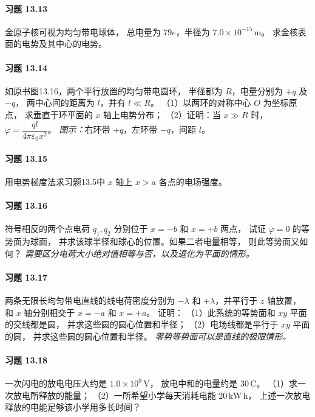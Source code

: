 \paragraph{习题 13.13}
金原子核可视为均匀带电球体，
总电量为 \(79e\)，半径为 \(7.0\times10^{-15}\,\mathrm m\)。
求金核表面的电势及其中心的电势。

\paragraph{习题 13.14}
如原书图13.16，两个平行放置的均匀带电圆环，
半径都为 \(R\)，电量分别为 \(+q\) 及 \(-q\)，
两中心间的距离为 \(l\)，并有 \(l\ll R\)。
（1）以两环的对称中心 \(O\) 为坐标原点，
求垂直于环平面的 \(x\) 轴上电势分布；
（2）证明：当 \(x\gg R\) 时，
\(\varphi=\dfrac{ql}{4\pi\varepsilon_0x^2}\)。
\textit{图示：}右环带 \(+q\)，左环带 \(-q\)，间距 \(l\)。

\paragraph{习题 13.15}
用电势梯度法求习题13.5中 \(x\) 轴上 \(x>a\) 各点的电场强度。

\paragraph{习题 13.16}
符号相反的两个点电荷 \(q_1,q_2\) 分别位于
\(x=-b\) 和 \(x=+b\) 两点，
试证 \(\varphi=0\) 的等势面为球面，
并求该球半径和球心的位置。如果二者电量相等，
则此等势面又如何？
\textit{需要区分电荷大小绝对值相等与否，以及退化为平面的情形。}

\paragraph{习题 13.17}
两条无限长均匀带电直线的线电荷密度分别为
\(-\lambda\) 和 \(+\lambda\)，并平行于 \(z\) 轴放置，
和 \(x\) 轴分别相交于 \(x=-a\) 和 \(x=+a\)。
证明：
（1）此系统的等势面和 \(xy\) 平面的交线都是圆，
并求这些圆的圆心位置和半径；
（2）电场线都是平行于 \(xy\) 平面的圆，
并求这些圆的圆心位置和半径。
\textit{零势等势面可以是直线的极限情形。}

\paragraph{习题 13.18}
一次闪电的放电电压大约是 \(1.0\times10^9\,\mathrm V\)，
放电中和的电量约是 \(30\,\mathrm C\)。
（1）求一次放电所释放的能量；
（2）一所希望小学每天消耗电能 \(20\,\mathrm{kW\,h}\)，
上述一次放电释放的电能足够该小学用多长时间？


